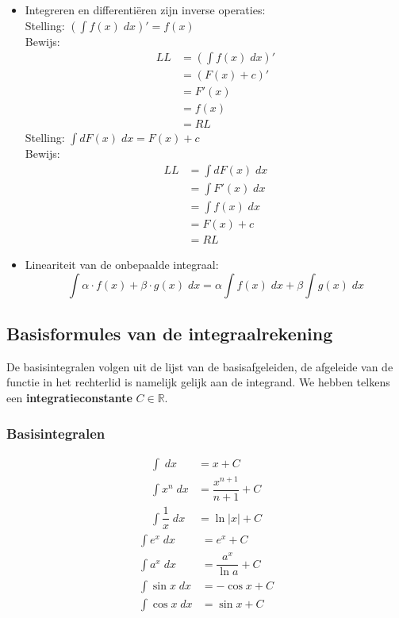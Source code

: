\documentclass[a4paper,12pt, twoside]{article}
\begin{document}
\begin{itemize}
\item Integreren en differentiëren zijn inverse operaties:\\
  Stelling: $\displaystyle \left(\int f(x) \;dx \right)'=f(x)$\\
  Bewijs:
  \begin{align*}
    LL &= \left(\int f(x) \;dx \right)'\\
       &= \left(F(x) + c \right)'\\
       &= F'(x)\\
       &= f(x)\\
       &= RL
  \end{align*}
  Stelling: $\displaystyle \int dF(x) \;dx = F(x) + c$\\
  Bewijs:
  \begin{align*}
    LL &= \int dF(x) \;dx\\
       &= \int F'(x) \;dx\\
       &= \int f(x) \;dx\\
       &= F(x) + c\\
       &= RL
  \end{align*}
\item Lineariteit van de onbepaalde integraal:
  $$\int \alpha \cdot f(x) + \beta \cdot g(x)\;dx = \alpha \int f(x)\;dx + \beta \int g(x)\;dx$$
\end{itemize}

\subsection{Basisformules van de integraalrekening}

De basisintegralen volgen uit de lijst van de basisafgeleiden, de afgeleide van de functie in het rechterlid is namelijk gelijk aan de integrand. We hebben telkens een {\bf integratieconstante} $C\in\mathbb{R}$.

\subsubsection*{Basisintegralen}
\begin{mdframed}
\begin{multicols}{2}
\begin{align*}
  \int \;dx &= x + C\\
  \int x^n \;dx &= \dfrac{x^{n+1}}{n+1} + C\\
  \int \dfrac{1}{x} \;dx &= \ln|x| + C
\end{align*}
\begin{align*}
  \int e^x \;dx &= e^x + C\\
  \int a^x \;dx &= \dfrac{a^x}{\ln a} + C\\
  \int \sin x \;dx &= -\cos x + C\\
  \int \cos x \;dx &= \sin x + C
\end{align*}
\end{multicols}
\end{mdframed}
\end{document}
